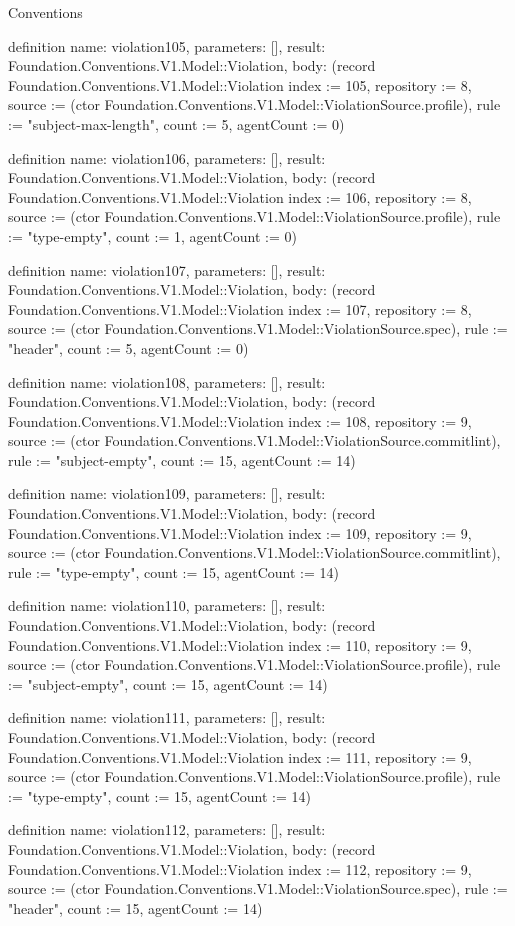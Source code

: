 \begin{lexlean}{Conventions}
\begin{semanticmodule}
definition{
  name: violation105,
  parameters: [],
  result: Foundation.Conventions.V1.Model::Violation,
  body: (record Foundation.Conventions.V1.Model::Violation {index := 105, repository := 8, source := (ctor Foundation.Conventions.V1.Model::ViolationSource.profile), rule := "subject-max-length", count := 5, agentCount := 0})
}

definition{
  name: violation106,
  parameters: [],
  result: Foundation.Conventions.V1.Model::Violation,
  body: (record Foundation.Conventions.V1.Model::Violation {index := 106, repository := 8, source := (ctor Foundation.Conventions.V1.Model::ViolationSource.profile), rule := "type-empty", count := 1, agentCount := 0})
}

definition{
  name: violation107,
  parameters: [],
  result: Foundation.Conventions.V1.Model::Violation,
  body: (record Foundation.Conventions.V1.Model::Violation {index := 107, repository := 8, source := (ctor Foundation.Conventions.V1.Model::ViolationSource.spec), rule := "header", count := 5, agentCount := 0})
}

definition{
  name: violation108,
  parameters: [],
  result: Foundation.Conventions.V1.Model::Violation,
  body: (record Foundation.Conventions.V1.Model::Violation {index := 108, repository := 9, source := (ctor Foundation.Conventions.V1.Model::ViolationSource.commitlint), rule := "subject-empty", count := 15, agentCount := 14})
}

definition{
  name: violation109,
  parameters: [],
  result: Foundation.Conventions.V1.Model::Violation,
  body: (record Foundation.Conventions.V1.Model::Violation {index := 109, repository := 9, source := (ctor Foundation.Conventions.V1.Model::ViolationSource.commitlint), rule := "type-empty", count := 15, agentCount := 14})
}

definition{
  name: violation110,
  parameters: [],
  result: Foundation.Conventions.V1.Model::Violation,
  body: (record Foundation.Conventions.V1.Model::Violation {index := 110, repository := 9, source := (ctor Foundation.Conventions.V1.Model::ViolationSource.profile), rule := "subject-empty", count := 15, agentCount := 14})
}

definition{
  name: violation111,
  parameters: [],
  result: Foundation.Conventions.V1.Model::Violation,
  body: (record Foundation.Conventions.V1.Model::Violation {index := 111, repository := 9, source := (ctor Foundation.Conventions.V1.Model::ViolationSource.profile), rule := "type-empty", count := 15, agentCount := 14})
}

definition{
  name: violation112,
  parameters: [],
  result: Foundation.Conventions.V1.Model::Violation,
  body: (record Foundation.Conventions.V1.Model::Violation {index := 112, repository := 9, source := (ctor Foundation.Conventions.V1.Model::ViolationSource.spec), rule := "header", count := 15, agentCount := 14})
}


\end{semanticmodule}
\end{lexlean}
